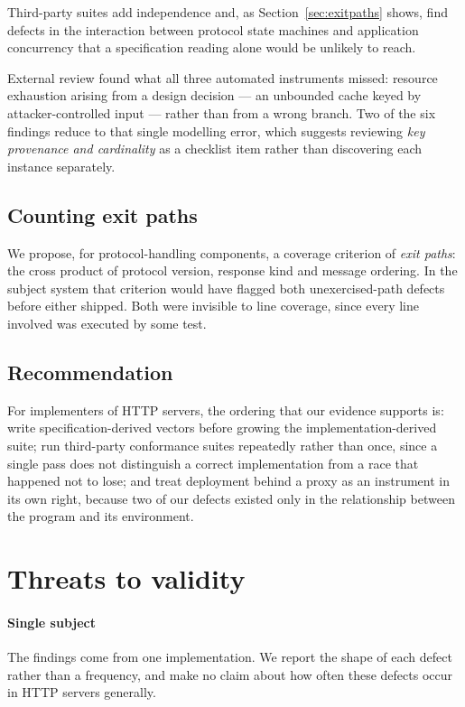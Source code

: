 \documentclass[preprint,12pt]{elsarticle}
\begin{document}
Third-party suites add independence and, as Section~\ref{sec:exitpaths} shows,
find defects in the interaction between protocol state machines and application
concurrency that a specification reading alone would be unlikely to reach.

External review found what all three automated instruments missed: resource
exhaustion arising from a design decision --- an unbounded cache keyed by
attacker-controlled input --- rather than from a wrong branch. Two of the six
findings reduce to that single modelling error, which suggests reviewing
\emph{key provenance and cardinality} as a checklist item rather than
discovering each instance separately.

\subsection{Counting exit paths}

We propose, for protocol-handling components, a coverage criterion of
\emph{exit paths}: the cross product of protocol version, response kind and
message ordering. In the subject system that criterion would have flagged both
unexercised-path defects before either shipped. Both were invisible to line
coverage, since every line involved was executed by some test.

\subsection{Recommendation}

For implementers of HTTP servers, the ordering that our evidence supports is:
write specification-derived vectors before growing the implementation-derived
suite; run third-party conformance suites repeatedly rather than once, since a
single pass does not distinguish a correct implementation from a race that
happened not to lose; and treat deployment behind a proxy as an instrument in
its own right, because two of our defects existed only in the relationship
between the program and its environment.

\section{Threats to validity}
\label{sec:threats}

\paragraph{Single subject}
The findings come from one implementation. We report the shape of each defect
rather than a frequency, and make no claim about how often these defects occur
in HTTP servers generally.
\end{document}
